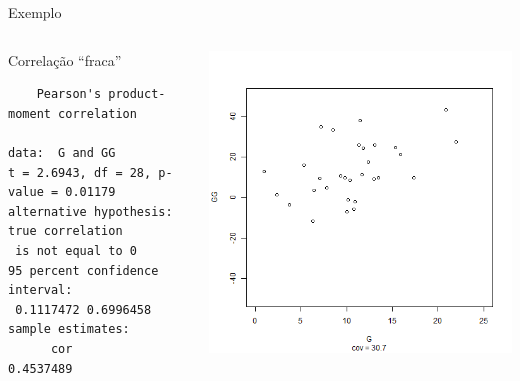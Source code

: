 \documentclass{beamer}
\begin{document}
\begin{frame}[fragile]{\scriptsize Exemplo}
  \begin{columns}
    \begin{column}{6cm}
      \begin{exampleblock}{Correlação ``fraca''}
        \tiny
\begin{verbatim}
	Pearson's product-moment correlation

data:  G and GG
t = 2.6943, df = 28, p-value = 0.01179
alternative hypothesis: true correlation
 is not equal to 0
95 percent confidence interval:
 0.1117472 0.6996458
sample estimates:
      cor 
0.4537489
\end{verbatim}
    \end{exampleblock}
   \end{column}
    \begin{column}{4cm}
  \begin{center}
    \includegraphics[height=.8\textheight]{Cap17/anim-3}
  \end{center}
    \end{column}
\end{columns}
\end{frame}
\end{document}
